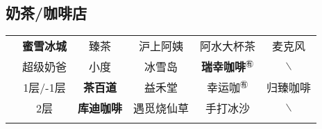 \subsection[奶茶/咖啡店]{奶茶/咖啡店}
\begin{table}[H]
    \centering
    \begin{tabular}{|c|c|c|c|c|c|}
        \Xhline{1.2pt}
        \multirow{2}{*}{食堂} & \textbf{蜜雪冰城}       & 臻茶            & 沪上阿姨  %
                            & 阿水大杯茶               & 麦克风                   \\
        \cline{2-6}
                            & 超级奶爸                & 小度            & 冰雪岛   %
                            & \textbf{瑞幸咖啡}$^{㊒}$ & $\backslash$          \\
        \Xhline{1.2pt}
        \multirow{2}{*}{大服} & 1层/-1层              & \textbf{茶百道}  & 益禾堂   %
                            & 幸运咖$^{㊒}$           & 归臻咖啡                  \\
        \cline{2-6}
                            & 2层                  & \textbf{库迪咖啡} & 遇觅烧仙草 %
                            & 手打冰沙                & $\backslash$          \\
        \Xhline{1.2pt}
    \end{tabular}
\end{table}

